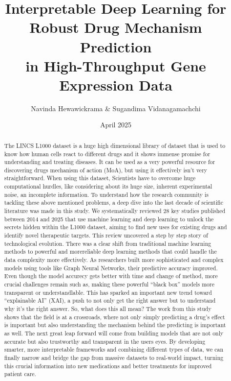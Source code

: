 \documentclass[twocolumn,12pt,a4paper]{article}
\title{Interpretable Deep Learning for Robust Drug Mechanism Prediction \\ in High-Throughput Gene Expression Data}
\author{Navinda Hewawickrama \& Sugandima Vidanagamachchi}
\date{April 2025}
\begin{document}
\onecolumn
\maketitle
\begin{abstract}
        The LINCS L1000 dataset is a huge high dimensional library of dataset that is used to know how human cells react to different drugs and it shows immense promise for understanding and treating diseases. It can be used as a very powerful resource for discovering drugs mechanism of action (MoA), but using it effectively isn't very straightforward. When using this dataset, Scientists have to overcome huge computational hurdles, like considering about its huge size, inherent experimental noise, an incomplete information. To understand how the research community is tackling these above mentioned problems, a deep dive into the last decade of scientific literature was made in this study. We systematically reviewed 28 key studies published between 2014 and 2025 that use machine learning and deep learning to unlock the secrets hidden within the L1000 dataset, aiming to find new uses for existing drugs and identify novel therapeutic targets. This review uncovered a step by step story of technological evolution. There was a clear shift from traditional machine learning methods to powerful and morereliable deep learning methods that could handle the data complexity more effectively. As researchers built more sophisticated and complex models using tools like Graph Neural Networks, their predictive accuracy improved. Even though the model accurecy gets better with time and change of method, more crucial challenges remain such as, making these powerful \enquote{black box} models more transparent or understandlable. This has sparked an important new trend toward \enquote{explainable AI} (XAI), a push to not only get the right answer but to understand why it's the right answer. So, what does this all mean? The work from this study shows that the field is at a crossroads, where not only simply predicting a drug's effect is important but also understanding the mechanism behind the predicting is important as well. The next great leap forward will come from building models that are not only accurate but also trustworthy and transparent in the users eyes. By developing smarter, more interpretable frameworks and combining different types of data, we can finally narrow and bridge the gap from massive datasets to real-world impact, turning this crucial information into new medications and better treatments for improved patient care.
\end{abstract}
\end{document}
